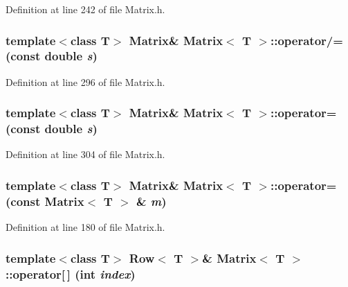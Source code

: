 Definition at line 242 of file Matrix.h.

\hypertarget{classMatrix_ad1acebe419756785acef046796fb6060}{
\subsubsection[{operator/=}]{\setlength{\rightskip}{0pt plus 5cm}template$<$class T$>$ {\bf Matrix}\& {\bf Matrix}$<$ T $>$::operator/= (const double {\em s})}}
\label{classMatrix_ad1acebe419756785acef046796fb6060}


Definition at line 296 of file Matrix.h.

\hypertarget{classMatrix_a9bea17f8319e2e2064fd85700e46d2fb}{
\subsubsection[{operator=}]{\setlength{\rightskip}{0pt plus 5cm}template$<$class T$>$ {\bf Matrix}\& {\bf Matrix}$<$ T $>$::operator= (const double {\em s})}}
\label{classMatrix_a9bea17f8319e2e2064fd85700e46d2fb}


Definition at line 304 of file Matrix.h.

\hypertarget{classMatrix_a94508f84ba0d62e81aa8d508aa43f1ec}{
\subsubsection[{operator=}]{\setlength{\rightskip}{0pt plus 5cm}template$<$class T$>$ {\bf Matrix}\& {\bf Matrix}$<$ T $>$::operator= (const {\bf Matrix}$<$ T $>$ \& {\em m})}}
\label{classMatrix_a94508f84ba0d62e81aa8d508aa43f1ec}


Definition at line 180 of file Matrix.h.

\hypertarget{classMatrix_a5af1a30e7a004b1cefe7b3f5398bcc77}{
\subsubsection[{operator[]}]{\setlength{\rightskip}{0pt plus 5cm}template$<$class T$>$ {\bf Row}$<$ T $>$\& {\bf Matrix}$<$ T $>$::operator\mbox{[}$\,$\mbox{]} (int {\em index})}}
\label{classMatrix_a5af1a30e7a004b1cefe7b3f5398bcc77}


